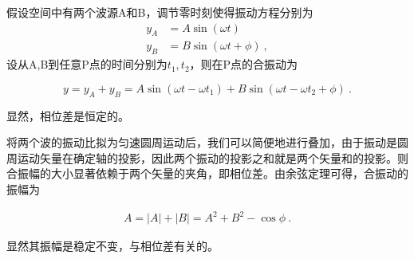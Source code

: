 假设空间中有两个波源A和B，调节零时刻使得振动方程分别为
\begin{equation}
\begin{aligned}
y_A&=A\sin(\omega t)\\
y_B&=B\sin (\omega t+\phi)~,
\end{aligned}
\end{equation}
设从A,B到任意P点的时间分别为$t_1,t_2$，则在P点的合振动为

\begin{equation}
y=y_A+y_B=A\sin(\omega t-\omega t_1)+B\sin(\omega t-\omega t_2+\phi)~.
\end{equation}

显然，相位差是恒定的。

将两个波的振动比拟为匀速圆周运动后，我们可以简便地进行叠加，由于振动是圆周运动矢量在确定轴的投影，因此两个振动的投影之和就是两个矢量和的投影。则合振幅的大小显著依赖于两个矢量的夹角，即相位差。由余弦定理可得，合振动的振幅为


\begin{equation}
\begin{aligned}
A=|A|+|B|=A^2+B^2-\cos\phi~.
\end{aligned}
\end{equation}


显然其振幅是稳定不变，与相位差有关的。